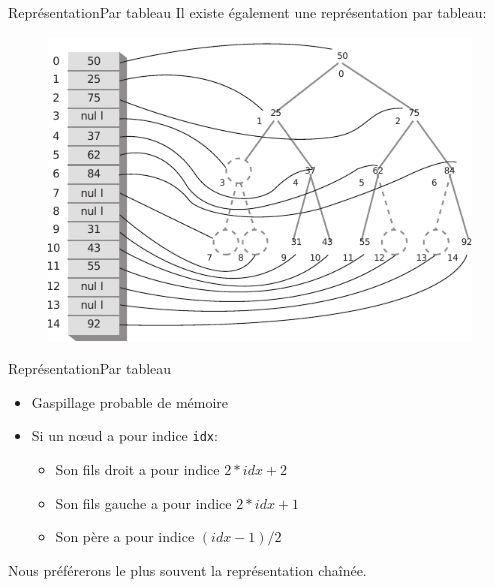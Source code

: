 \documentclass[12pt,a4paper]{beamer}
\begin{document}
\begin{frame}{Représentation}{Par tableau}
Il existe également une représentation par tableau:
\begin{figure}
\includegraphics[scale=0.8]{figs/array_tree}
\end{figure}
\end{frame}

\begin{frame}{Représentation}{Par tableau}
\begin{itemize}
\item Gaspillage probable de mémoire
\item Si un n\oe ud a pour indice \texttt{idx}:
\begin{itemize}
\item Son fils droit a pour indice $2 * idx + 2$
\item Son fils gauche a pour indice $2 * idx + 1$
\item Son père a pour indice $(idx-1)/2$
\end{itemize}
\end{itemize}
Nous préférerons le plus souvent la représentation chaînée.
\end{frame}
\end{document}
